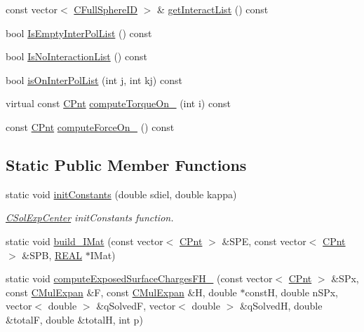 \begin{DoxyCompactItemize}
\item 
const vector$<$ \hyperlink{classCFullSphereID}{C\-Full\-Sphere\-I\-D} $>$ \& \hyperlink{classCSolExpCenter_a32fdfae2b6cf8cd5ab4a1319b2c25b0e}{get\-Interact\-List} () const 
\item 
bool \hyperlink{classCSolExpCenter_adce98ad1dd45ff4382715e6281edf70b}{Is\-Empty\-Inter\-Pol\-List} () const 
\item 
bool \hyperlink{classCSolExpCenter_a3ef672da73c2caf77eaaf3eaf5b37ad1}{Is\-No\-Interaction\-List} () const 
\item 
bool \hyperlink{classCSolExpCenter_aefece12db7605c8f0d3dfe0271450471}{is\-On\-Inter\-Pol\-List} (int j, int kj) const 
\item 
virtual const \hyperlink{classCPnt}{C\-Pnt} \hyperlink{classCSolExpCenter_a9948ac19674e1ec785536d08d407f3ff}{compute\-Torque\-On\-\_} (int i) const 
\item 
const \hyperlink{classCPnt}{C\-Pnt} \hyperlink{classCSolExpCenter_a635592a43c2e5d1c3e42fa8ad0251b13}{compute\-Force\-On\-\_} () const 
\end{DoxyCompactItemize}
\subsection*{Static Public Member Functions}
\begin{DoxyCompactItemize}
\item 
static void \hyperlink{classCSolExpCenter_ad653d2d896fb0afeb738948c19cfd6d2}{init\-Constants} (double sdiel, double kappa)
\begin{DoxyCompactList}\small\item\em \hyperlink{classCSolExpCenter}{C\-Sol\-Exp\-Center} init\-Constants function. \end{DoxyCompactList}\item 
static void \hyperlink{classCSolExpCenter_aff368c517d5f7a1cebd836179cd0cc1d}{build\-\_\-\-I\-Mat} (const vector$<$ \hyperlink{classCPnt}{C\-Pnt} $>$ \&S\-P\-E, const vector$<$ \hyperlink{classCPnt}{C\-Pnt} $>$ \&S\-P\-B, \hyperlink{util_8h_a5821460e95a0800cf9f24c38915cbbde}{R\-E\-A\-L} $\ast$I\-Mat)
\item 
static void \hyperlink{classCSolExpCenter_aa12372dc727deec3421517950588e89e}{compute\-Exposed\-Surface\-Charges\-F\-H\-\_\-} (const vector$<$ \hyperlink{classCPnt}{C\-Pnt} $>$ \&S\-Px, const \hyperlink{classCMulExpan}{C\-Mul\-Expan} \&F, const \hyperlink{classCMulExpan}{C\-Mul\-Expan} \&H, double $\ast$const\-H, double n\-S\-Px, vector$<$ double $>$ \&q\-Solved\-F, vector$<$ double $>$ \&q\-Solved\-H, double \&total\-F, double \&total\-H, int p)
\end{DoxyCompactItemize}
